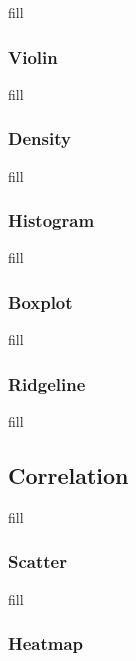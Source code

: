 \documentclass[
  b5paper]{book}
\begin{document}
fill

\hypertarget{violin}{%
\subsubsection*{Violin}\label{violin}}

fill

\hypertarget{density}{%
\subsubsection*{Density}\label{density}}

fill

\hypertarget{histogram}{%
\subsubsection*{Histogram}\label{histogram}}

fill

\hypertarget{boxplot}{%
\subsubsection*{Boxplot}\label{boxplot}}

fill

\hypertarget{ridgeline}{%
\subsubsection*{Ridgeline}\label{ridgeline}}

fill

\hypertarget{correlation}{%
\subsection*{Correlation}\label{correlation}}

fill

\hypertarget{scatter}{%
\subsubsection*{Scatter}\label{scatter}}

fill

\hypertarget{heatmap}{%
\subsubsection*{Heatmap}\label{heatmap}}
\end{document}
